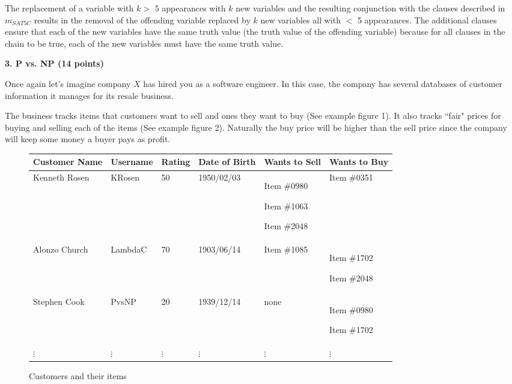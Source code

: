 \documentclass[12pt]{elsart}
\begin{document}
\begin{enumerate}
The replacement of a variable with $k >$ 5 appearances with $k$ new variables and the resulting conjunction with the clauses described in $m_{SAT5C}$ results in the removal of the offending variable replaced by $k$ new variables all with $<$ 5 appearances. The additional clauses ensure that each of the new variables have the same truth value (the truth value of the offending variable) because for all clauses in the chain to be true, each of the new variables must have the same truth value.
\end{enumerate}

{\bf 3.  P vs. NP (14 points)}

Once again let's imagine company $X$ has hired you as a software engineer.  In this case, the company has several databases of customer information it manages for its resale business.  

The business tracks items that customers want to sell and ones they want to buy (See example figure 1).  It also tracks ``fair" prices for buying and selling each of the items (See example figure 2).  Naturally the buy price will be higher than the sell price since the company will keep some money a buyer pays as profit.

\begin{figure}[h]
  \caption{Customers and their items }
\begin{tabular}{ |p{1.75cm}|p{2.0cm}|p{1.25cm}|p{2.5cm}|p{2.5cm}|p{2.5cm}|}
  \hline
   Customer Name & Username & Rating &  Date of Birth &  Wants to Sell & Wants to Buy \\
  \hline  \hline
   Kenneth Rosen & KRosen &  50 & 1950/02/03 &  Item \#0980 \par Item \#1063 \par Item \#2048  & Item \#0351 \\
  \hline
   Alonzo Church & LambdaC&  70 & 1903/06/14 &  Item \#1085  & Item \#1702 \par Item \#2048 \\
  \hline
   Stephen Cook & PvsNP &  20 & 1939/12/14 &  none  & Item \#0980 \par Item \#1702 \\
  \hline
   $\vdots$ & $\vdots$& $\vdots$  &  $\vdots$ & $\vdots$  & $\vdots$ \\
  \hline
\end{tabular}
\end{figure}
\end{document}
